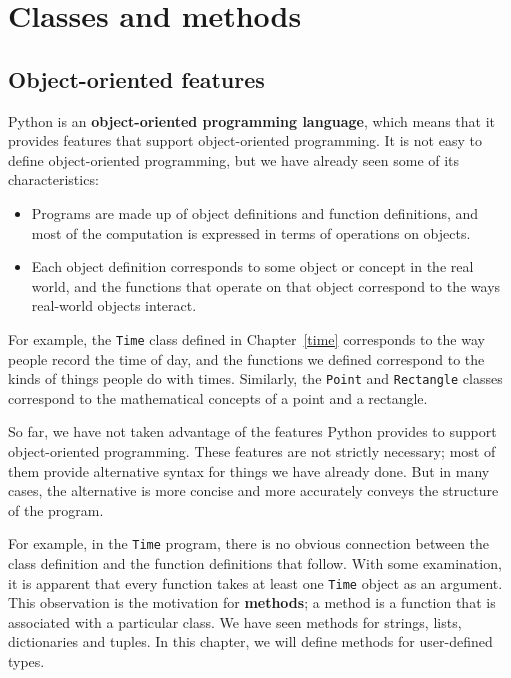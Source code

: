 \chapter{Classes and methods}


\section{Object-oriented features}


Python is an {\bf object-oriented programming language}, which means
that it provides features that support object-oriented
programming.
%
It is not easy to define object-oriented programming, but we have
already seen some of its characteristics:

\begin{itemize}

\item Programs are made up of object definitions and function
definitions, and most of the computation is expressed in terms
of operations on objects.

\item Each object definition corresponds to some object or concept
in the real world, and the functions that operate on that object
correspond to the ways real-world objects interact.

\end{itemize}

For example, the {\tt Time} class defined in Chapter~\ref{time}
corresponds to the way people record the time of day, and the
functions we defined correspond to the kinds of things people do with
times.  Similarly, the {\tt Point} and {\tt Rectangle} classes
correspond to the mathematical concepts of a point and a rectangle.

So far, we have not taken advantage of the features Python provides to
support object-oriented programming.  These
features are not strictly necessary; most of them provide
alternative syntax for things we have already done.  But in many cases,
the alternative is more concise and more accurately conveys the
structure of the program.

For example, in the {\tt Time} program, there is no obvious
connection between the class definition and the function definitions
that follow.  With some examination, it is apparent that every function
takes at least one {\tt Time} object as an argument.
%
%
This observation is the motivation for {\bf methods}; a method is
a function that is associated with a particular class.
We have seen methods for strings, lists, dictionaries and tuples.
In this chapter, we will define methods for user-defined types.

